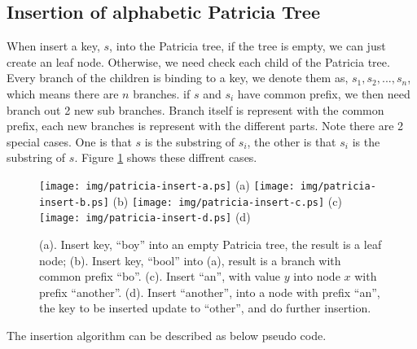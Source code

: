 \documentclass{article}
\begin{document}
\subsection{Insertion of alphabetic Patricia Tree}
When insert a key, $s$, into the Patricia tree, if the tree is empty, we
can just create an leaf node. Otherwise, we need check each child of the
Patricia tree. Every branch of the children is binding to a key, we denote
them as, $s_1, s_2, ..., s_n$, which means there are $n$ branches.
if $s$ and $s_i$ have common prefix, we then need branch out 2 new sub
branches. Branch itself is represent with the common prefix, each new
branches is represent with the different parts. Note there are 2 special
cases. One is that $s$ is the substring of $s_i$, the other is that $s_i$
is the substring of $s$. Figure \ref{fig:patricia-insert} shows these
diffrent cases.

\begin{figure}[htbp]
       \begin{center}
	\texttt{[image: img/patricia-insert-a.ps]} (a)
	\texttt{[image: img/patricia-insert-b.ps]} (b)
	\texttt{[image: img/patricia-insert-c.ps]} (c)
	\texttt{[image: img/patricia-insert-d.ps]} (d)
        \caption{(a). Insert key, ``boy'' into an empty Patricia tree,
	the result is a leaf node; \newline
	(b). Insert key, ``bool'' into (a), result is a branch with
	common prefix ``bo''. \newline
        (c). Insert ``an'', with value $y$ into node $x$ with prefix
	``another''. \newline
        (d). Insert ``another'', into a node with prefix ``an'', the key to be inserted update to ``other'', and do further insertion.}
        \label{fig:patricia-insert}
       \end{center}
\end{figure}

The insertion algorithm can be described as below pseudo code.
\end{document}
